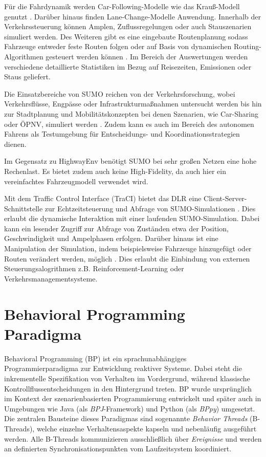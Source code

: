 Für die Fahrdynamik werden Car-Following-Modelle wie das Krauß-Modell genutzt \cite{sumo_car_following}. Darüber hinaus finden Lane-Change-Modelle Anwendung. Innerhalb der Verkehrssteuerung können Amplen, Zuflussregelungen oder auch Stauszenarien simuliert werden. Des Weiteren gibt es eine eingebaute Routenplanung sodass Fahrzeuge entweder feste Routen folgen oder auf Basis von dynamischen Routing-Algorithmen gesteuert werden können \cite{sumo_vehicles}. Im Bereich der Auswertungen werden verschiedene detaillierte Statistiken im Bezug auf Reisezeiten, Emissionen oder Staus geliefert.

Die Einsatzbereiche von SUMO reichen von der Verkehrsforschung, wobei Verkehrsflüsse, Engpässe oder Infrastrukturmaßnahmen untersucht werden bis hin zur Stadtplanung und Mobilitätskonzepten bei denen Szenarien, wie Car-Sharing oder ÖPNV, simuliert werden \cite{SUMO2018}. Zudem kann es auch im Bereich des autonomen Fahrens als Testumgebung für Entscheidungs- und Koordinationsstrategien dienen.

Im Gegensatz zu HighwayEnv benötigt SUMO bei sehr großen Netzen eine hohe Rechenlast. Es bietet zudem auch keine High-Fidelity, da auch hier ein vereinfachtes Fahrzeugmodell verwendet wird.

Mit dem Traffic Control Interface (TraCI) bietet das DLR eine Client-Server-Schnittstelle zur Echtzeitsteuerung und Abfrage von SUMO-Simulationen \cite{sumo_traci}. Dies erlaubt die dynamische Interaktion mit einer laufenden SUMO-Simulation. Dabei kann ein lesender Zugriff zur Abfrage von Zuständen etwa der Position, Geschwindigkeit und Ampelphasen erfolgen. Darüber hinaus ist eine Manipulation der Simulation, indem beispielsweise Fahrzeuge hinzugefügt oder Routen verändert werden, möglich \cite{sumo_traci}. Dies erlaubt die Einbindung von externen Steuerungsalogrithmen z.B. Reinforcement-Learning oder Verkehrsmanagementsysteme.

\section{Behavioral Programming Paradigma}\label{sec:behavioral-programming}
Behavioral Programming (BP) ist ein sprachunabhängiges Programmierparadigma zur Entwicklung reaktiver Systeme\cite{Harel2012}.
Dabei steht die inkrementelle Spezifikation von Verhalten im Vordergrund, während klassische Kontrollflussentscheidungen in den Hintergrund treten\cite{Harel2012}.
BP wurde ursprünglich im Kontext der szenarienbasierten Programmierung entwickelt und später auch in Umgebungen wie Java (als \emph{BPJ}-Framework) und Python (als \emph{BPpy}) umgesetzt\cite{Harel2010}.
Die zentralen Bausteine dieses Paradigmas sind sogenannte \emph{Behavior Threads} (B-Threads), welche einzelne Verhaltensaspekte kapseln und nebenläufig ausgeführt werden\cite{Harel2010}.
Alle B-Threads kommunizieren ausschließlich über \emph{Ereignisse} und werden an definierten Synchronisationspunkten vom Laufzeitsystem koordiniert\cite{Harel2012}.

